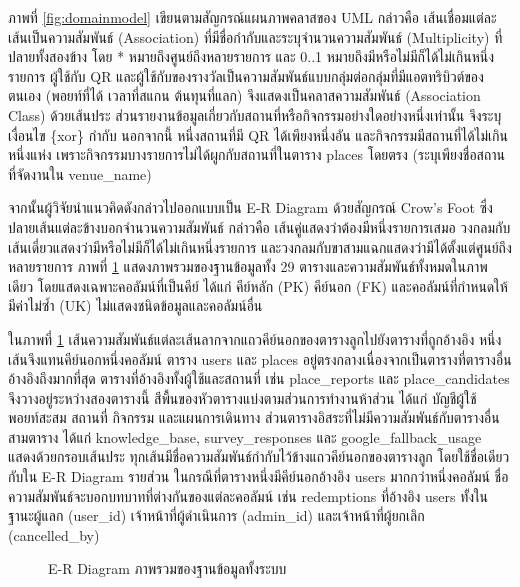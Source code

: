 ภาพที่ \ref{fig:domainmodel} เขียนตามสัญกรณ์แผนภาพคลาสของ UML กล่าวคือ เส้นเชื่อมแต่ละเส้นเป็นความสัมพันธ์ (Association) ที่มีชื่อกำกับและระบุจำนวนความสัมพันธ์ (Multiplicity) ที่ปลายทั้งสองข้าง โดย * หมายถึงศูนย์ถึงหลายรายการ และ 0..1 หมายถึงมีหรือไม่มีก็ได้ไม่เกินหนึ่งรายการ ผู้ใช้กับ QR และผู้ใช้กับของรางวัลเป็นความสัมพันธ์แบบกลุ่มต่อกลุ่มที่มีแอตทริบิวต์ของตนเอง (พอยท์ที่ได้ เวลาที่สแกน ต้นทุนที่แลก) จึงแสดงเป็นคลาสความสัมพันธ์ (Association Class) ด้วยเส้นประ ส่วนรายงานข้อมูลเกี่ยวกับสถานที่หรือกิจกรรมอย่างใดอย่างหนึ่งเท่านั้น จึงระบุเงื่อนไข \{xor\} กำกับ นอกจากนี้ หนึ่งสถานที่มี QR ได้เพียงหนึ่งอัน และกิจกรรมมีสถานที่ได้ไม่เกินหนึ่งแห่ง เพราะกิจกรรมบางรายการไม่ได้ผูกกับสถานที่ในตาราง places โดยตรง (ระบุเพียงชื่อสถานที่จัดงานใน venue\_name)

จากนั้นผู้วิจัยนำแนวคิดดังกล่าวไปออกแบบเป็น E-R Diagram ด้วยสัญกรณ์ Crow's Foot ซึ่งปลายเส้นแต่ละข้างบอกจำนวนความสัมพันธ์ กล่าวคือ เส้นคู่แสดงว่าต้องมีหนึ่งรายการเสมอ วงกลมกับเส้นเดี่ยวแสดงว่ามีหรือไม่มีก็ได้ไม่เกินหนึ่งรายการ และวงกลมกับขาสามแฉกแสดงว่ามีได้ตั้งแต่ศูนย์ถึงหลายรายการ ภาพที่ \ref{fig:erd_overview} แสดงภาพรวมของฐานข้อมูลทั้ง 29 ตารางและความสัมพันธ์ทั้งหมดในภาพเดียว โดยแสดงเฉพาะคอลัมน์ที่เป็นคีย์ ได้แก่ คีย์หลัก (PK) คีย์นอก (FK) และคอลัมน์ที่กำหนดให้มีค่าไม่ซ้ำ (UK) ไม่แสดงชนิดข้อมูลและคอลัมน์อื่น

ในภาพที่ \ref{fig:erd_overview} เส้นความสัมพันธ์แต่ละเส้นลากจากแถวคีย์นอกของตารางลูกไปยังตารางที่ถูกอ้างอิง หนึ่งเส้นจึงแทนคีย์นอกหนึ่งคอลัมน์ ตาราง users และ places อยู่ตรงกลางเนื่องจากเป็นตารางที่ตารางอื่นอ้างอิงถึงมากที่สุด ตารางที่อ้างอิงทั้งผู้ใช้และสถานที่ เช่น place\_reports และ place\_candidates จึงวางอยู่ระหว่างสองตารางนี้ สีพื้นของหัวตารางแบ่งตามส่วนการทำงานห้าส่วน ได้แก่ บัญชีผู้ใช้ พอยท์สะสม สถานที่ กิจกรรม และแผนการเดินทาง ส่วนตารางอิสระที่ไม่มีความสัมพันธ์กับตารางอื่นสามตาราง ได้แก่ knowledge\_base, survey\_responses และ google\_fallback\_usage แสดงด้วยกรอบเส้นประ ทุกเส้นมีชื่อความสัมพันธ์กำกับไว้ข้างแถวคีย์นอกของตารางลูก โดยใช้ชื่อเดียวกับใน E-R Diagram รายส่วน ในกรณีที่ตารางหนึ่งมีคีย์นอกอ้างอิง users มากกว่าหนึ่งคอลัมน์ ชื่อความสัมพันธ์จะบอกบทบาทที่ต่างกันของแต่ละคอลัมน์ เช่น redemptions ที่อ้างอิง users ทั้งในฐานะผู้แลก (user\_id) เจ้าหน้าที่ผู้ดำเนินการ (admin\_id) และเจ้าหน้าที่ผู้ยกเลิก (cancelled\_by)

\begin{landscape}
\begin{figure}[H]
\centering
{}
\caption{E-R Diagram ภาพรวมของฐานข้อมูลทั้งระบบ}
\label{fig:erd_overview}
\end{figure}
\end{landscape}

